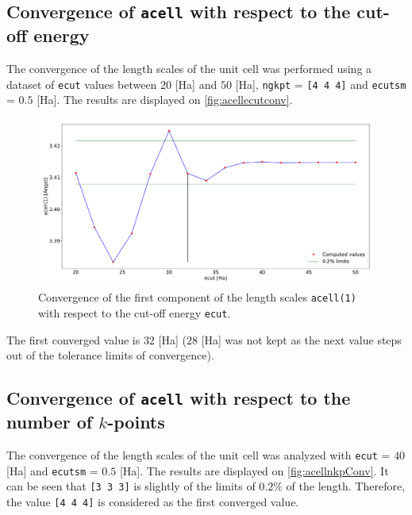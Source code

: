 \documentclass[11pt,a4paper]{article}
\begin{document}
\subsection{Convergence of \texttt{acell} with respect to the cut-off energy}
The convergence of the length scales of the unit cell was performed using a dataset of \texttt{ecut} values between $20$ [Ha] and $50$ [Ha], \texttt{ngkpt} = \texttt{[4 4 4]} and \texttt{ecutsm} = $0.5$ [Ha]. The results are displayed on \autoref{fig:acellecutconv}.
\begin{figure}[H]
\centering
\includegraphics[width=\textwidth]{images/acellEcutConv.pdf}
\caption{Convergence of the first component of the length scales \texttt{acell(1)} with respect to the cut-off energy \texttt{ecut}.}
\label{fig:acellecutconv}
\end{figure}

The first converged value is $32$ [Ha] ($28$ [Ha] was not kept as the next value steps out of the tolerance limits of convergence).
\subsection{Convergence of \texttt{acell} with respect to the number of $k$-points}
The convergence of the length scales of the unit cell was analyzed with \texttt{ecut} = $40$ [Ha] and \texttt{ecutsm} = $0.5$ [Ha]. The results are displayed on \autoref{fig:acellnkpConv}. It can be seen that \texttt{[3 3 3]} is slightly of the limits of $0.2\%$ of the length. Therefore, the value \texttt{[4 4 4]} is considered as the first converged value.
\end{document}

